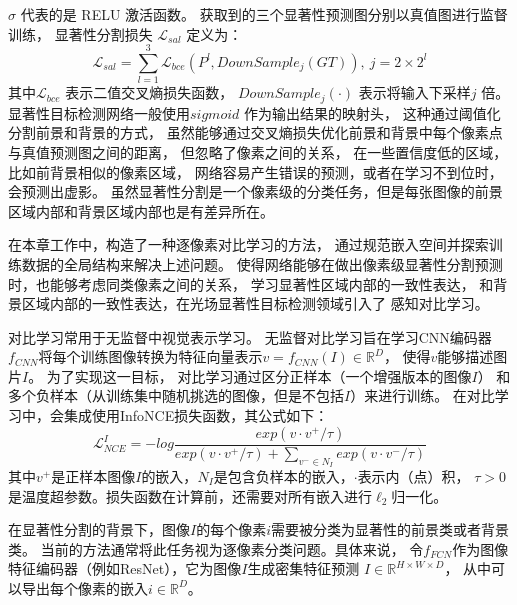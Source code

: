 $ \sigma $ 代表的是 RELU 激活函数。
获取到的三个显著性预测图分别以真值图进行监督训练，
显著性分割损失
$ \mathcal{L}_{sal} $
定义为：
%
%
%
%
\begin{equation}
	\mathcal{L}_{sal} = \sum_{l = 1}^{3}  
	\mathcal{L}_{bce} \left ( P^{l}, DownSample_{j}\left (  GT \right ) 
	\right ), ~ j = 2\times 2^l
	\label{chpt4:eq:loss_sal}
\end{equation}
%
%
%
%
其中$\mathcal{L}_{bce}$ 表示二值交叉熵损失函数，
$DownSample_{j}(\cdot)$ 表示将输入下采样$j$ 倍。
%
%
%
%
%
\label{chap:part4_cons}
% 
% 
% 
% 
显著性目标检测网络一般使用$sigmoid$ 作为输出结果的映射头，
这种通过阈值化分割前景和背景的方式，
虽然能够通过交叉熵损失优化前景和背景中每个像素点与真值预测图之间的距离，
但忽略了像素之间的关系，
在一些置信度低的区域，比如前背景相似的像素区域，
网络容易产生错误的预测，或者在学习不到位时，会预测出虚影。
%
%
%
%
虽然显著性分割是一个像素级的分类任务，但是每张图像的前景区域内部和背景区域内部也是有差异所在。

在本章工作中，构造了一种逐像素对比学习的方法，
通过规范嵌入空间并探索训练数据的全局结构来解决上述问题。
使得网络能够在做出像素级显著性分割预测时，也能够考虑同类像素之间的关系，
学习显著性区域内部的一致性表达，
和背景区域内部的一致性表达，在光场显著性目标检测领域引入了
感知对比学习。



对比学习常用于无监督中视觉表示学习。
无监督对比学习旨在学习CNN编码器$f_{CNN}$将每个训练图像转换为特征向量表示$v=f_{CNN}(I) \in \mathbb{R}^{D}$，
使得$v$能够描述图片$I$。
为了实现这一目标，
对比学习通过区分正样本（一个增强版本的图像$I$）
和多个负样本（从训练集中随机挑选的图像，但是不包括$I$）来进行训练。
在对比学习中，会集成使用InfoNCE损失函数，其公式如下：
\begin{equation}
	\mathcal{L} _{NCE}^{I}=-log \frac{exp(v \cdot v^{+ }/\tau )}
{exp(v \cdot v^{+}/\tau )+ \sum_{v^{-}\in N_{I}} exp(v \cdot v^{-}/\tau )} 
\label{chpt4_equ_nce}
\end{equation}
其中$v^{+}$是正样本图像$I$的嵌入，$N_{I}$是包含负样本的嵌入，$\cdot$表示内（点）积，
$\tau >0$是温度超参数。损失函数在计算前，还需要对所有嵌入进行$\ell_{2}$归一化。
\par
% 
% 
% 

% 

在显著性分割的背景下，图像$I$的每个像素$i$需要被分类为显著性的前景类或者背景类。
当前的方法通常将此任务视为逐像素分类问题。具体来说，
令$f_{FCN}$作为图像特征编码器（例如ResNet），它为图像$I$生成密集特征预测
$I\in \mathbb{R}^{ H \times W \times D}$，
从中可以导出每个像素的嵌入$i \in  \mathbb{R}^{D}$。



